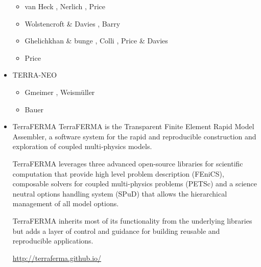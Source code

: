 \begin{itemize}
\begin{scriptsize}
\begin{itemize}
\item[\twothousandsixteen] van Heck \etal \cite{vade16}, Nerlich \etal \cite{necg16}, 
                           Price \cite{pric16}
\item[\twothousandseventeen] Wolstencroft \& Davies \cite{woda17}, Barry \etal \cite{badw17} 
\item[\twothousandeighteen] Ghelichkhan \& bunge \cite{ghbu18}, Colli \etal \cite{cogb18}, 
                            Price \& Davies \cite{prda18}
\item[\twothousandnineteen] Price \etal \cite{prdp19}
\end{itemize}
\end{scriptsize}

\item {\codefont TERRA-NEO} 

\begin{scriptsize}
\begin{itemize}
\item[\twothousandfifteen] Gmeimer \etal \cite{gmrs15}, Weism{\"u}ller \etal \cite{wegg15}
\item[\twothousandtwenty] Bauer \etal \cite{babd20}
\end{itemize}
\end{scriptsize}


\item {\codefont TerraFERMA} 
TerraFERMA is the Transparent Finite Element Rapid Model Assembler, a software system for the rapid and reproducible construction and exploration of coupled multi-physics models.

TerraFERMA leverages three advanced open-source libraries for scientific computation that provide high level problem description (FEniCS), composable solvers for coupled multi-physics problems (PETSc) and a science neutral options handling system (SPuD) that allows the hierarchical management of all model options.

TerraFERMA inherits most of its functionality from the underlying libraries but adds a layer of control and guidance for building reusable and reproducible applications.

\url{http://terraferma.github.io/}


\end{itemize}
